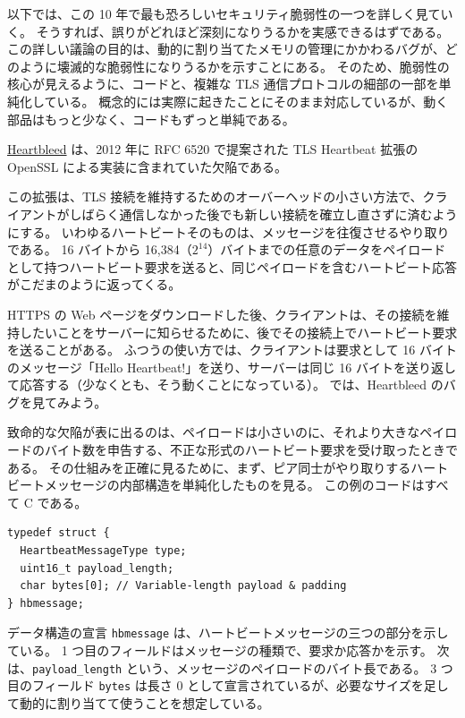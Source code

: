 \documentclass[uplatex]{jsarticle}
\def\label#1{}%
\begin{document}
以下では、この 10 年で最も恐ろしいセキュリティ脆弱性の一つを詳しく見ていく。
そうすれば、誤りがどれほど深刻になりうるかを実感できるはずである。
この詳しい議論の目的は、動的に割り当てたメモリの管理にかかわるバグが、どのように壊滅的な脆弱性になりうるかを示すことにある。
そのため、脆弱性の核心が見えるように、コードと、複雑な TLS 通信プロトコルの細部の一部を単純化している。
概念的には実際に起きたことにそのまま対応しているが、動く部品はもっと少なく、コードもずっと単純である。

\begin{dfn}[Heartbleed]\label{dfn:ch9-heartbleed}
\underline{Heartbleed} は、2012 年に RFC 6520 で提案された TLS Heartbeat 拡張の OpenSSL による実装に含まれていた欠陥である。
\end{dfn}

この拡張は、TLS 接続を維持するためのオーバーヘッドの小さい方法で、クライアントがしばらく通信しなかった後でも新しい接続を確立し直さずに済むようにする。
いわゆるハートビートそのものは、メッセージを往復させるやり取りである。
16 バイトから 16,384（$2^{14}$）バイトまでの任意のデータをペイロードとして持つハートビート要求を送ると、同じペイロードを含むハートビート応答がこだまのように返ってくる。

HTTPS の Web ページをダウンロードした後、クライアントは、その接続を維持したいことをサーバーに知らせるために、後でその接続上でハートビート要求を送ることがある。
ふつうの使い方では、クライアントは要求として 16 バイトのメッセージ「Hello Heartbeat!」を送り、サーバーは同じ 16 バイトを送り返して応答する（少なくとも、そう動くことになっている）。
では、Heartbleed のバグを見てみよう。

致命的な欠陥が表に出るのは、ペイロードは小さいのに、それより大きなペイロードのバイト数を申告する、不正な形式のハートビート要求を受け取ったときである。
その仕組みを正確に見るために、まず、ピア同士がやり取りするハートビートメッセージの内部構造を単純化したものを見る。
この例のコードはすべて C である。

\begin{verbatim}
typedef struct {
  HeartbeatMessageType type;
  uint16_t payload_length;
  char bytes[0]; // Variable-length payload & padding
} hbmessage;
\end{verbatim}

データ構造の宣言 \texttt{hbmessage} は、ハートビートメッセージの三つの部分を示している。
1 つ目のフィールドはメッセージの種類で、要求か応答かを示す。
次は、\texttt{payload\_length} という、メッセージのペイロードのバイト長である。
3 つ目のフィールド \texttt{bytes} は長さ 0 として宣言されているが、必要なサイズを足して動的に割り当てて使うことを想定している。
\end{document}
